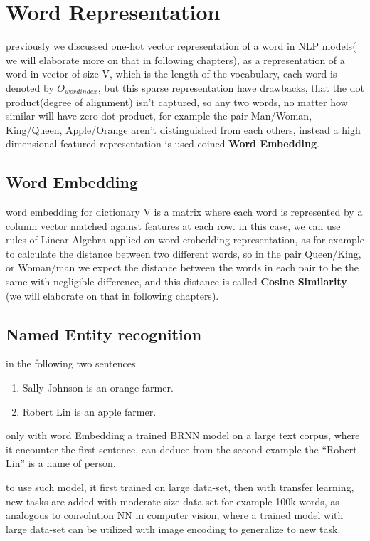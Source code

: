 \documentclass[4apaper,12pt]{book}
\begin{document}
  \section{Word Representation}
  \begin{description}
  \item previously we discussed one-hot vector representation of a word in NLP models( we will elaborate more on that in following chapters), as a representation of a word in vector of size V, which is the length of the vocabulary, each word is denoted by $O_{word index}$, but this sparse representation have drawbacks, that the dot product(degree of alignment) isn't captured, so any two words, no matter how similar will have zero dot product,  for example the pair Man/Woman, King/Queen, Apple/Orange aren't distinguished from each others, instead a high dimensional featured representation is used coined \textbf{Word Embedding}.
    \subsection{Word Embedding}
    \begin{description}
    \item word embedding for dictionary V is a matrix where each word is represented by a column vector matched against features at each row. in this case, we can use rules of Linear Algebra applied on word embedding representation, as for example to calculate the distance between two different words, so in the pair Queen/King, or Woman/man we expect the distance between the words in each pair to be the same with negligible difference, and this distance is called \textbf{Cosine Similarity}  (we will elaborate on that in following chapters).
      \subsection{Named Entity recognition}
      \begin{description}
      \item in the following two sentences \begin{enumerate}
      \item Sally Johnson is an orange farmer.
      \item Robert Lin is an apple farmer.
      \end{enumerate}
      \item only with word Embedding a trained BRNN model on a large text corpus, where it encounter the first sentence, can deduce from the second example the ``Robert Lin'' is a name of person.
      \item to use such model, it first trained on large data-set, then with transfer learning, new tasks are added with moderate size data-set for example 100k words, as analogous to convolution NN in computer vision, where a trained model with large data-set can be utilized with image encoding to generalize to new task.


\end{description}
\end{description}
\end{description}
\end{document}
